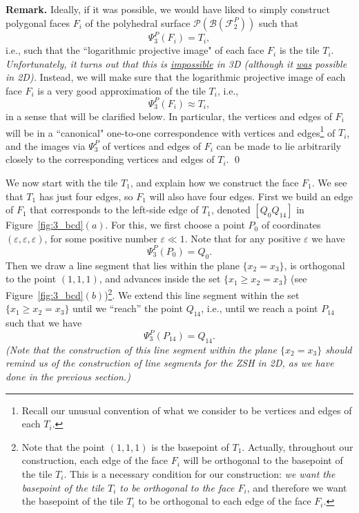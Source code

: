 \documentclass[12pt,letterpaper]{article}
\renewcommand{\P}{\mathcal{P}}
\newcommand{\B}{\mathcal{B}}
\begin{document}
\bigskip

\noindent
{\bf Remark.} Ideally, if it was possible, we would have liked to simply construct polygonal faces $F_i$ of the polyhedral surface $\P(\B(\mathcal{F}_2^P))$ such that 
$$
\Psi_3^P(F_i) = T_i,
$$ 
i.e., such that the ``logarithmic projective image" of each face $F_i$ is the tile $T_i$. {\em Unfortunately, it turns out that this is \underline{impossible} in 3D (although it \underline{was} possible in 2D).} Instead, we will make sure that the logarithmic projective image of each face $F_i$ is a very good approximation of the tile $T_i$, i.e., 
$$
\Psi_3^P(F_i) \approx T_i,
$$ 
in a sense that will be clarified below. In particular, the vertices and edges of $F_i$  will be in a ``canonical" one-to-one correspondence with vertices and edges\footnote{Recall our unusual convention of what we consider to be vertices and edges of each $T_i$.} of $T_i$, and the images via $\Psi_3^P$ of vertices and edges of $F_i$ can be made to lie arbitrarily closely to the corresponding vertices and edges of $T_i$. 
\qed

\bigskip

We now start with the tile $T_1$, and explain how we construct the face $F_1$. 
We see that $T_1$ has just four edges, so $F_1$ will also have four edges. First we build an edge of $F_1$ that corresponds to the left-side edge of $T_1$, denoted $[Q_0 Q_{14}]$ in Figure~\ref{fig:3_bcd}$(a)$. For this, we first choose a point $P_0$ of coordinates $(\varepsilon, \varepsilon, \varepsilon)$, for some positive number $\varepsilon \ll 1$. Note that for any positive $\varepsilon$ we have 
$$
\Psi_3^P(P_{0}) = Q_{0}.
$$
Then we draw a line segment that lies within the plane $\{x_2=x_3\}$, is orthogonal to the point $(1,1,1)$, and advances inside the set $\{x_1 \ge x_2 = x_3\}$ (see Figure~\ref{fig:3_bcd}$(b)$)\footnote{Note that the point $(1,1,1)$ is the basepoint of $T_1$. Actually, throughout our construction, each edge of the face $F_i$ will be orthogonal to the basepoint of the tile $T_i$. This is a necessary condition for our construction: {\em we want the basepoint of the tile $T_i$ to be orthogonal to the face $F_i$}, and therefore we want the basepoint of the tile $T_i$ to be orthogonal to each edge of the face $F_i$.}. We extend this line segment within the set $\{x_1 \ge x_2 = x_3\}$ until we ``reach'' the point $Q_{14}$, i.e., until we reach a point $P_{14}$ such that we have 
$$
\Psi_3^P(P_{14}) = Q_{14}.
$$
{\em (Note that the construction of this line segment within the plane $\{x_2=x_3\}$ should remind us of the construction of line segments for the ZSH in 2D, as we have done in the previous section.)}
\end{document}
